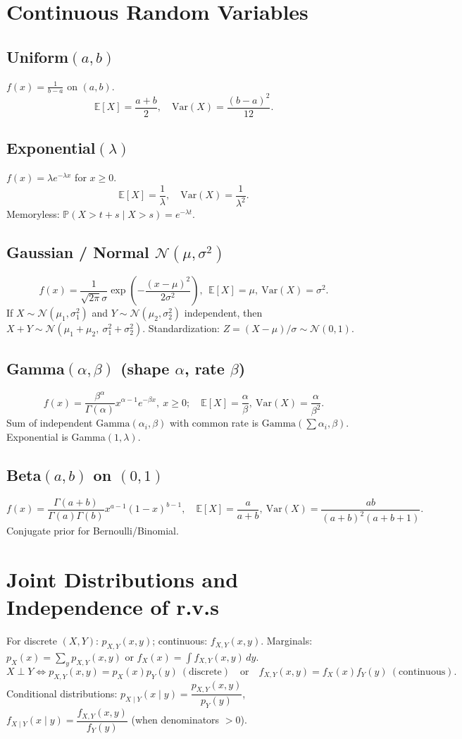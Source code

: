 \documentclass[11pt]{article}
\newcommand{\Pbb}{\mathbb{P}}
\newcommand{\E}{\mathbb{E}}
\newcommand{\Var}{\mathrm{Var}}
\newcommand{\1}{\mathbf{1}}
\begin{document}
\section{Continuous Random Variables}
\subsection*{Uniform$(a,b)$}
$f(x)=\frac{1}{b-a}$ on $(a,b)$.
\[
  \E[X]=\frac{a+b}{2},\quad \Var(X)=\frac{(b-a)^2}{12}.
\]

\subsection*{Exponential$(\lambda)$}
$f(x)=\lambda e^{-\lambda x}$ for $x\ge 0$.
\[
  \E[X]=\frac{1}{\lambda},\quad \Var(X)=\frac{1}{\lambda^2}.
\]
Memoryless: $\Pbb(X>t+s\mid X>s)=e^{-\lambda t}$.

\subsection*{Gaussian / Normal $\mathcal{N}(\mu,\sigma^2)$}
\[
  f(x)=\frac{1}{\sqrt{2\pi}\sigma}\exp\!\left(-\frac{(x-\mu)^2}{2\sigma^2}\right),\ \ 
  \E[X]=\mu,\ \Var(X)=\sigma^2.
\]
If $X\sim \mathcal{N}(\mu_1,\sigma_1^2)$ and $Y\sim \mathcal{N}(\mu_2,\sigma_2^2)$ independent, then $X+Y\sim \mathcal{N}(\mu_1+\mu_2,\ \sigma_1^2+\sigma_2^2)$.
Standardization: $Z=(X-\mu)/\sigma\sim\mathcal{N}(0,1)$.

\subsection*{Gamma$(\alpha,\beta)$ (shape $\alpha$, rate $\beta$)}
\[
  f(x)=\frac{\beta^\alpha}{\Gamma(\alpha)}x^{\alpha-1}e^{-\beta x},\ x\ge 0;\quad
  \E[X]=\frac{\alpha}{\beta},\ \Var(X)=\frac{\alpha}{\beta^2}.
\]
Sum of independent $\text{Gamma}(\alpha_i,\beta)$ with common rate is $\text{Gamma}(\sum \alpha_i,\beta)$.
Exponential is Gamma$(1,\lambda)$.

\subsection*{Beta$(a,b)$ on $(0,1)$}
\[
  f(x)=\frac{\Gamma(a+b)}{\Gamma(a)\Gamma(b)}x^{a-1}(1-x)^{b-1},\quad
  \E[X]=\frac{a}{a+b},\ \Var(X)=\frac{ab}{(a+b)^2(a+b+1)}.
\]
Conjugate prior for Bernoulli/Binomial.

\section{Joint Distributions and Independence of r.v.s}
For discrete $(X,Y)$: $p_{X,Y}(x,y)$; continuous: $f_{X,Y}(x,y)$. Marginals:
$p_X(x)=\sum_y p_{X,Y}(x,y)$ or $f_X(x)=\int f_{X,Y}(x,y)\,dy$.
\[
  X\perp Y \iff p_{X,Y}(x,y)=p_X(x)p_Y(y)\ (\text{discrete}) \quad
  \text{or}\quad f_{X,Y}(x,y)=f_X(x)f_Y(y)\ (\text{continuous}).
\]
Conditional distributions: $p_{X\mid Y}(x\mid y)=\dfrac{p_{X,Y}(x,y)}{p_Y(y)}$, \
$f_{X\mid Y}(x\mid y)=\dfrac{f_{X,Y}(x,y)}{f_Y(y)}$ (when denominators $>0$).
\end{document}
